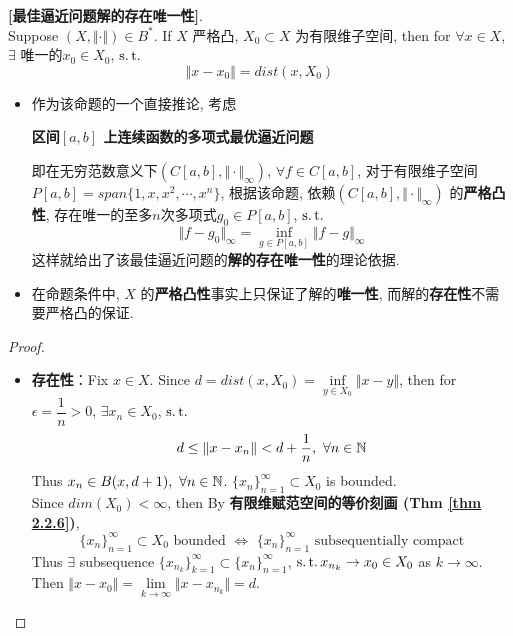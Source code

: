 	\begin{proposition}\label{prop 2.3.2}
		\textbf{[最佳逼近问题解的存在唯一性]}. \\
		Suppose $(X , \Vert \cdot \Vert) \in B^*$. If $X$ 严格凸, $X_0 \subset X$ 为有限维子空间, then for $\forall x \in X$, $\exists$ 唯一的$x_0 \in X_0$, $\operatorname{s.t.}$
		\[ \Vert x - x_0 \Vert = dist(x , X_0) \]
		
		\vspace{4em}
		
		\begin{rmk}
			\begin{itemize}
				\item 作为该命题的一个直接推论, 考虑
				\begin{center}
					\textbf{区间$[a , b]$ 上连续函数的多项式最优逼近问题}
				\end{center}
			即在无穷范数意义下$(C[a , b] , \Vert \cdot \Vert_\infty)$, $\forall f \in C[a , b]$, 对于有限维子空间$P[a , b] = span\{ 1 , x , x^2 , \cdots , x^n \}$, 根据该命题, 依赖$(C[a , b] , \Vert \cdot \Vert_\infty)$ 的\textbf{严格凸性}, 存在唯一的至多$n$次多项式$g_0 \in P[a , b]$, $\operatorname{s.t.}$
			\[ \Vert f - g_0 \Vert_{\infty} = \inf_{g \in P[a , b]} \Vert f - g \Vert_\infty \]
			这样就给出了该最佳逼近问题的\textbf{解的存在唯一性}的理论依据. 
			
			\vspace{6em}
			
			\item 在命题条件中, $X$ 的\textbf{严格凸性}事实上只保证了解的\textbf{唯一性}, 而解的\textbf{存在性}不需要严格凸的保证.
			\end{itemize}
		\end{rmk}
		
		\newpage
		
		\begin{proof}
			\begin{itemize}
				\item \textbf{存在性}：Fix $x \in X$. Since $d = dist(x , X_0) = \underset{y \in X_0}{\inf} {\Vert x - y \Vert}$, then for $\epsilon = \dfrac{1}{n} > 0$, $\exists x_n \in X_0$, $\operatorname{s.t.}$
				\[ d \leq \Vert x - x_n \Vert < d + \frac{1}{n} , \,\, \forall n \in \mathbb{N} \]
				Thus $x_n \in B(x , d + 1) , \,\, \forall n \in \mathbb{N}$. $\{ x_n \}_{n = 1}^{\infty} \subset X_0$ is bounded. \\
				Since $dim(X_0) < \infty$, then By \textbf{有限维赋范空间的等价刻画 (Thm \ref{thm 2.2.6})}, 
				\[ \{ x_n \}_{n = 1}^{\infty} \subset X_0 \,\, \text{bounded} \,\, \Leftrightarrow \,\, \{ x_n \}_{n = 1}^{\infty} \,\, \text{subsequentially compact} \]
				Thus $\exists$ subsequence $\{ x_{n_k} \}_{k = 1}^{\infty} \subset \{ x_n \}_{n = 1}^{\infty}$, $\operatorname{s.t.} x_{n_k} \to x_0 \in X_0$ as $k \to \infty$. \\
				Then $\Vert x - x_0 \Vert = \underset{k \to \infty}{\lim} {\Vert x - x_{n_k} \Vert} = d$.
				

\end{itemize}
\end{proof}
\end{proposition}
